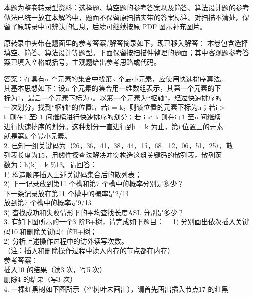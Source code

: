\begin{question}
\begin{solution}
本题为整卷转录型资料：选择题、填空题的参考答案以及简答、算法设计题的参考做法已统一放在本解答中，题面不保留原扫描夹带的答案标注。对扫描不清处，保留了原转录中可辨认的信息，后续可继续按原 PDF 图示补充图片。

\medskip
\noindent 原转录中夹带在题面里的参考答案/解答摘录如下，现已移入解答：
本卷包含选择填空、简答、算法设计等题型。下面保留按扫描件整理的题面；其中客观题参考答案已填入空格或括号，主观题给出参考思路或代码。

答案：在具有n 个元素的集合中找第k 个最小元素，应使用快速排序算法。\\
其基本思想如下：设n 个元素的集合用一维数组表示，其第一个元素的下\\
标为1，最后一个元素下标为n。以第一个元素为“枢轴”，经过快速排序的\\
一次划分，找到“枢轴”的位置i，若i = k，则该位置的元素下标为n；若i >\\
k 则在1 至i-1 间继续进行快速排序的划分；若 i < k 则在i+1 至n 间继续\\
进行快速排序的划分。这种划分一直进行到i = k 为止，第i 位置上的元素\\
就是第k 个最小元素。\\
2. 已知一组关键码为（26，36，41，38，44，15，68，12，06，51，25），散\\
列表长度为15，用线性探查法解决冲突构造这组关键码的散列表。散列函\\
数为：h(k)= k \%13。请回答：\\
1) 构造顺序插入上述关键码集合后的散列表；\\
2) 下一记录放到第11 个槽和第7 个槽中的概率分别是多少？\\
下一条记录放在第11 个槽中的概率是2/13\\
放到第7 个槽中的概率是9/13\\
3) 查找成功和失败情形下的平均查找长度ASL 分别是多少？\\
3. 有如下图所示的一个3 阶B+树，请完成如下题目：\
\
1) 分别画出依次插入关键码10 和删除关键码4 的B+树；\\
2) 分析上述操作过程中的访外读写次数。\\
（注：插入和删除操作过程中读入内存的节点都在内存）\\
参考答案：\\
插入10 的结果（读3 次，写5 次）\\
删除4 的结果（写3 次）\\
4. 一棵红黑树如下图所示（空树叶未画出），请首先画出插入节点17 的红黑\

\end{solution}
\end{question}
